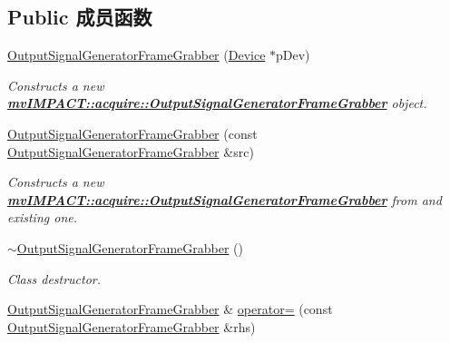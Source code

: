 \subsection*{Public 成员函数}
\begin{DoxyCompactItemize}
\item 
\hyperlink{classmv_i_m_p_a_c_t_1_1acquire_1_1_output_signal_generator_frame_grabber_a633df02b634f912222d7d40a37e1a46a}{Output\+Signal\+Generator\+Frame\+Grabber} (\hyperlink{classmv_i_m_p_a_c_t_1_1acquire_1_1_device}{Device} $\ast$p\+Dev)
\begin{DoxyCompactList}\small\item\em Constructs a new {\bfseries \hyperlink{classmv_i_m_p_a_c_t_1_1acquire_1_1_output_signal_generator_frame_grabber}{mv\+I\+M\+P\+A\+C\+T\+::acquire\+::\+Output\+Signal\+Generator\+Frame\+Grabber}} object. \end{DoxyCompactList}\item 
\hyperlink{classmv_i_m_p_a_c_t_1_1acquire_1_1_output_signal_generator_frame_grabber_a9c9a7fe10cc42c34c82712caad48b147}{Output\+Signal\+Generator\+Frame\+Grabber} (const \hyperlink{classmv_i_m_p_a_c_t_1_1acquire_1_1_output_signal_generator_frame_grabber}{Output\+Signal\+Generator\+Frame\+Grabber} \&src)
\begin{DoxyCompactList}\small\item\em Constructs a new {\bfseries \hyperlink{classmv_i_m_p_a_c_t_1_1acquire_1_1_output_signal_generator_frame_grabber}{mv\+I\+M\+P\+A\+C\+T\+::acquire\+::\+Output\+Signal\+Generator\+Frame\+Grabber}} from and existing one. \end{DoxyCompactList}\item 
\hypertarget{classmv_i_m_p_a_c_t_1_1acquire_1_1_output_signal_generator_frame_grabber_aa833724f43161d0f9fe7f7764a761891}{\hyperlink{classmv_i_m_p_a_c_t_1_1acquire_1_1_output_signal_generator_frame_grabber_aa833724f43161d0f9fe7f7764a761891}{$\sim$\+Output\+Signal\+Generator\+Frame\+Grabber} ()}\label{classmv_i_m_p_a_c_t_1_1acquire_1_1_output_signal_generator_frame_grabber_aa833724f43161d0f9fe7f7764a761891}

\begin{DoxyCompactList}\small\item\em Class destructor. \end{DoxyCompactList}\item 
\hypertarget{classmv_i_m_p_a_c_t_1_1acquire_1_1_output_signal_generator_frame_grabber_a7a558c69cbbce2745dac0c7020f4f963}{\hyperlink{classmv_i_m_p_a_c_t_1_1acquire_1_1_output_signal_generator_frame_grabber}{Output\+Signal\+Generator\+Frame\+Grabber} \& \hyperlink{classmv_i_m_p_a_c_t_1_1acquire_1_1_output_signal_generator_frame_grabber_a7a558c69cbbce2745dac0c7020f4f963}{operator=} (const \hyperlink{classmv_i_m_p_a_c_t_1_1acquire_1_1_output_signal_generator_frame_grabber}{Output\+Signal\+Generator\+Frame\+Grabber} \&rhs)}\label{classmv_i_m_p_a_c_t_1_1acquire_1_1_output_signal_generator_frame_grabber_a7a558c69cbbce2745dac0c7020f4f963}


\end{DoxyCompactItemize}
